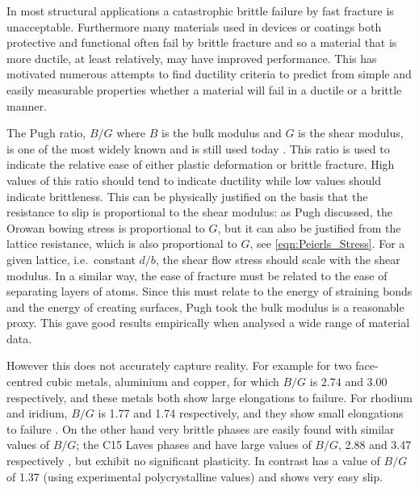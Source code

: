 

In most structural applications a catastrophic brittle failure by fast fracture is unacceptable. Furthermore many materials used in devices or coatings both protective and functional often fail by brittle fracture and so a material that is more ductile, at least relatively, may have improved performance. This has motivated numerous attempts to find ductility criteria to predict from simple and easily measurable properties whether a material will fail in a ductile or a brittle manner.

The Pugh ratio, $B/G$ where $B$ is the bulk modulus and $G$ is the shear modulus, is one of the most widely known and is still used today \cite{Sangiovanni2011,Aryal2014,Wang2015,Hu2016,Zhuang2017}. This ratio is used to indicate the relative ease of either plastic deformation or brittle fracture. High values of this ratio should tend to indicate ductility while low values should indicate brittleness. This can be physically justified on the basis that the resistance to slip is proportional to the shear modulus: as Pugh discussed, the Orowan bowing stress is proportional to $G$, but it can also be justified from the lattice resistance, which is also proportional to $G$, see \autoref{eqn:Peierls_Stress}. For a given lattice, i.e.\ constant $d/b$, the shear flow stress should scale with the shear modulus. In a similar way, the ease of fracture must be related to the ease of separating layers of atoms. Since this must relate to the energy of straining bonds and the energy of creating surfaces, Pugh took the bulk modulus is a reasonable proxy. This gave good results empirically when \citet{Pugh1954} analysed a wide range of material data.

However this does not accurately capture reality. For example for two face-centred cubic metals, aluminium and copper, for which $B/G$ is 2.74 and 3.00 respectively, and these metals both show large elongations to failure. For rhodium and iridium, $B/G$ is 1.77 and 1.74 respectively, and they show small elongations to failure \cite{Pugh1954}. On the other hand very brittle phases are easily found with similar values of $B/G$; the C15 Laves phases \cite{Stein2004,Stein2005}  and  have large values of $B/G$, 2.88 and 3.47 respectively \cite{Chu1995}, but exhibit no significant plasticity. In contrast  has a value of $B/G$ of 1.37 (using experimental polycrystalline values) \cite{Barsoum2011} and shows very easy slip.



